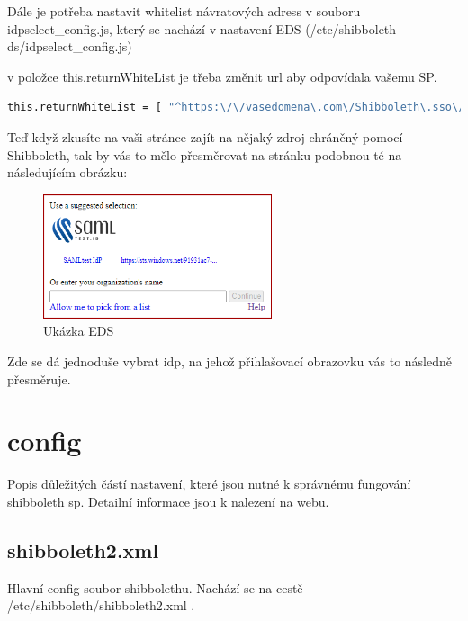 Dále je potřeba nastavit whitelist návratových adress v souboru idpselect\_config.js, který se nachází v nastavení EDS (/etc/shibboleth-ds/idpselect\_config.js)

v položce this.returnWhiteList je třeba změnit url aby odpovídala vašemu SP. 

\begin{lstlisting}[language=Bash]
this.returnWhiteList = [ "^https:\/\/vasedomena\.com\/Shibboleth\.sso\/Login.*$" , "^https:\/\/vasedomena\.com\/Shibboleth\.sso\/Login.*$" ];
\end{lstlisting}

Teď když zkusíte na vaši stránce zajít na nějaký zdroj chráněný pomocí Shibboleth, tak by vás to mělo přesměrovat na stránku podobnou té na následujícím obrázku:

\begin{figure}[bp]
	\centering
    \includegraphics[width=0.6\textwidth]{obrazky-figures/disc.png}
	\caption{Ukázka EDS}
	\label{EDS}
\end{figure}


Zde se dá jednoduše vybrat idp, na jehož přihlašovací obrazovku vás to následně přesměruje.

\chapter{config}
Popis důležitých částí nastavení, které jsou nutné k správnému fungování shibboleth sp. Detailní informace jsou k nalezení na webu\cite{SPconfig}. 

\section{shibboleth2.xml}
Hlavní config soubor shibbolethu. Nachází se na cestě /etc/shibboleth/shibboleth2.xml .

